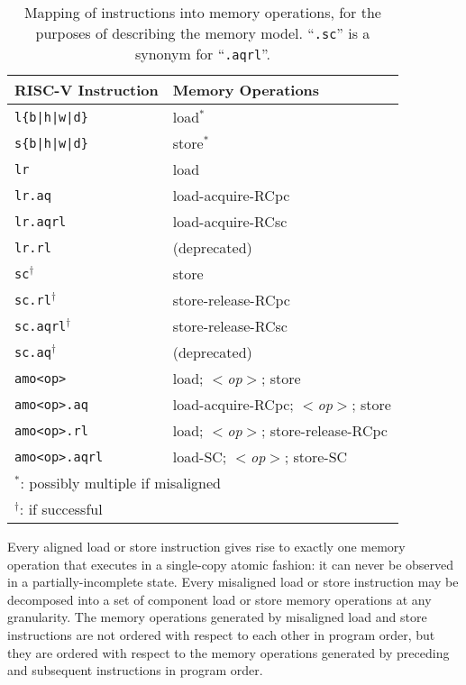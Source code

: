 \begin{table}[h!]
  \centering
  \begin{tabular}{|l|l|}
    \hline
    RISC-V Instruction & Memory Operations \\
    \hline
    \hline
    \tt l\{b|h|w|d\}    & load$^*$               \\
    \tt s\{b|h|w|d\}    & store$^*$              \\
    \hline
    \hline
    \tt lr              & load                   \\
    \tt lr.aq           & load-acquire-RCpc      \\
    \tt lr.aqrl         & load-acquire-RCsc      \\
    \tt lr.rl           & (deprecated)           \\
    \hline
    \hline
    \tt sc$^\dagger$      & store                  \\
    \tt sc.rl$^\dagger$   & store-release-RCpc     \\
    \tt sc.aqrl$^\dagger$ & store-release-RCsc     \\
    \tt sc.aq$^\dagger$   & (deprecated)           \\
    \hline
    \hline
    \tt amo<op>         & load; {\em $<$op$>$}; store \\
    \tt amo<op>.aq      & load-acquire-RCpc; {\em $<$op$>$}; store \\
    \tt amo<op>.rl      & load; {\em $<$op$>$}; store-release-RCpc \\
    \tt amo<op>.aqrl    & load-SC; {\em $<$op$>$}; store-SC \\
    \hline
    \multicolumn{2}{l}{$^*$: possibly multiple if misaligned} \\
    \multicolumn{2}{l}{$^\dagger$: if successful} \\
  \end{tabular}
  \caption{Mapping of instructions into memory operations, for the purposes of describing the memory model.  ``{\tt.sc}'' is a synonym for ``{\tt.aqrl}''.}
  \label{tab:memoryoperations}
\end{table}

Every aligned load or store instruction gives rise to exactly one memory operation that executes in a single-copy atomic fashion: it can never be observed in a partially-incomplete state.
Every misaligned load or store instruction may be decomposed into a set of component load or store memory operations at any granularity.
The memory operations generated by misaligned load and store instructions are not ordered with respect to each other in program order, but they are ordered with respect to the memory operations generated by preceding and subsequent instructions in program order.

